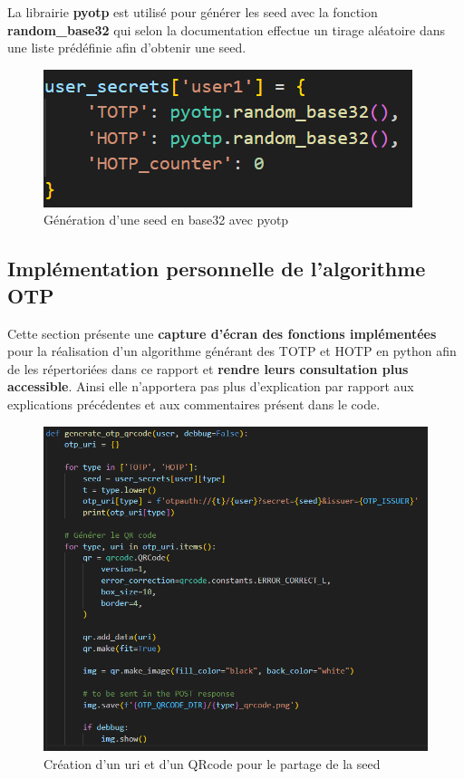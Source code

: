 \documentclass[a4paper, 10pt]{article}
\newcommand{\otp}{\textsc{OTP} }
\newcommand{\totp}{\textsc{TOTP} }
\newcommand{\hotp}{\textsc{HOTP} }
\begin{document}
La librairie \textbf{pyotp} est utilisé pour générer les seed avec la fonction \textbf{random\_base32} qui selon la documentation effectue un tirage aléatoire dans une liste prédéfinie afin d'obtenir une seed.

\begin{figure}[H]
        \centering
        \includegraphics[scale=1]{img/C_proto/code/code_pyotp_seed.png}
        \caption{Génération d'une seed en base32 avec pyotp\\}
        \label{fig:code-seed}
\end{figure}

    
    \subsection{Implémentation personnelle de l'algorithme \otp}

Cette section présente une \textbf{capture d'écran des fonctions implémentées} pour la réalisation d'un algorithme générant des \totp et \hotp en python afin de les répertoriées dans ce rapport et \textbf{rendre leurs consultation plus accessible}. Ainsi elle n'apportera pas plus d'explication par rapport aux explications précédentes et aux commentaires présent dans le code.


\begin{figure}[H]
        \centering
        \includegraphics[scale=0.8]{img/C_proto/code/code_share_seed.png}
        \caption{Création d'un uri et d'un QRcode pour le partage de la seed\\}
        \label{fig:code-round-time}
\end{figure}
\end{document}
